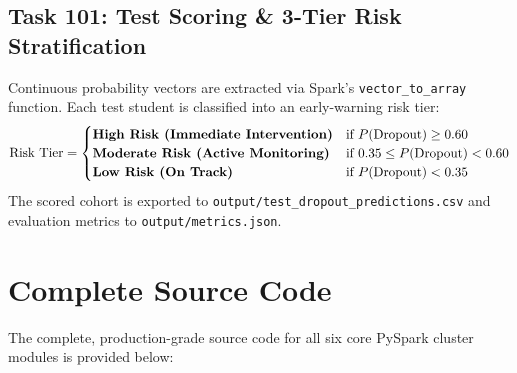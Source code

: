 \documentclass[11pt,a4paper]{article}
\begin{document}
\subsection{Task 101: Test Scoring \& 3-Tier Risk Stratification}
Continuous probability vectors are extracted via Spark's \texttt{vector\_to\_array} function. Each test student is classified into an early-warning risk tier:
\begin{equation}
    \text{Risk Tier} = \begin{cases}
        \text{\textbf{High Risk (Immediate Intervention)}} & \text{if } P(\text{Dropout}) \ge 0.60 \\
        \text{\textbf{Moderate Risk (Active Monitoring)}} & \text{if } 0.35 \le P(\text{Dropout}) < 0.60 \\
        \text{\textbf{Low Risk (On Track)}} & \text{if } P(\text{Dropout}) < 0.35
    \end{cases}
\end{equation}
The scored cohort is exported to \texttt{output/test\_dropout\_predictions.csv} and evaluation metrics to \texttt{output/metrics.json}.

\section{Complete Source Code}
\label{sec:source_code}

The complete, production-grade source code for all six core PySpark cluster modules is provided below:
\end{document}

